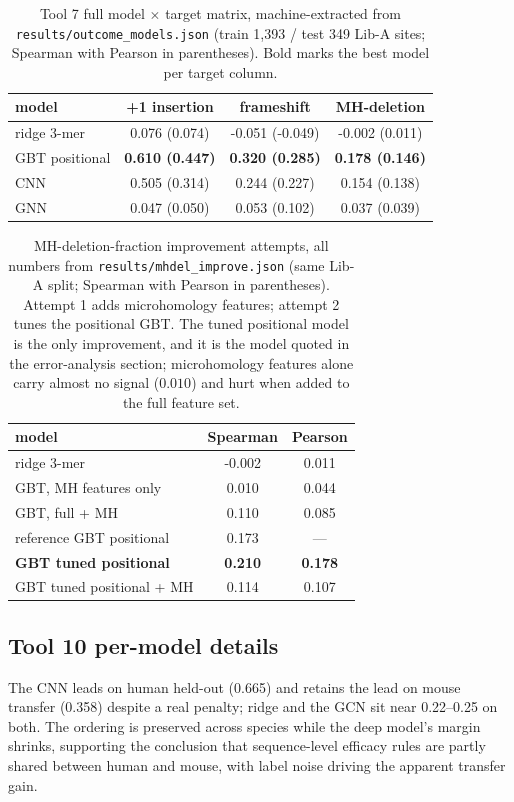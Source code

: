\documentclass[12pt]{article}
\begin{document}
\begin{table}[h]
\centering\small
\caption{Tool 7 full model $\times$ target matrix, machine-extracted from \texttt{results/outcome\_models.json} (train 1{,}393 / test 349 Lib-A sites; Spearman with Pearson in parentheses). Bold marks the best model per target column.}
\label{tab:outcome-matrix}
\begin{tabular}{lccc}
\hline
model & +1 insertion & frameshift & MH-deletion \\
\hline
ridge 3-mer & 0.076 (0.074) & -0.051 (-0.049) & -0.002 (0.011) \\
GBT positional & \textbf{0.610 (0.447)} & \textbf{0.320 (0.285)} & \textbf{0.178 (0.146)} \\
CNN & 0.505 (0.314) & 0.244 (0.227) & 0.154 (0.138) \\
GNN & 0.047 (0.050) & 0.053 (0.102) & 0.037 (0.039) \\
\hline
\end{tabular}
\end{table}
\begin{table}[h]
\centering\small
\caption{MH-deletion-fraction improvement attempts, all numbers from \texttt{results/mhdel\_improve.json} (same Lib-A split; Spearman with Pearson in parentheses). Attempt 1 adds microhomology features; attempt 2 tunes the positional GBT. The tuned positional model is the only improvement, and it is the model quoted in the error-analysis section; microhomology features alone carry almost no signal ($0.010$) and hurt when added to the full feature set.}
\label{tab:mhdel}
\begin{tabular}{lcc}
\hline
model & Spearman & Pearson \\
\hline
ridge 3-mer & -0.002 & 0.011 \\
GBT, MH features only & 0.010 & 0.044 \\
GBT, full + MH & 0.110 & 0.085 \\
reference GBT positional & 0.173 & --- \\
\textbf{GBT tuned positional} & \textbf{0.210} & \textbf{0.178} \\
GBT tuned positional + MH & 0.114 & 0.107 \\
\hline
\end{tabular}
\end{table}
\subsection{Tool 10 per-model details}
The CNN leads on human held-out (0.665) and retains the lead on mouse
transfer (0.358) despite a real penalty; ridge and the GCN sit near
0.22--0.25 on both. The ordering is preserved across species while the deep
model's margin shrinks, supporting the conclusion that sequence-level
efficacy rules are partly shared between human and mouse, with label
noise driving the apparent transfer gain.
\end{document}
